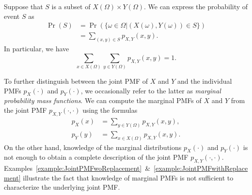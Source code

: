 Suppose that $S$ is a subset of $X(\Omega) \times Y(\Omega)$.
We can express the probability of event $S$ as
\begin{equation*}
\begin{split}
\Pr (S) &= \Pr (\{ \omega \in \Omega | (X(\omega), Y(\omega)) \in S \}) \\
&= \sum_{(x,y) \in S} p_{X,Y} (x, y) .
\end{split}
\end{equation*}
In particular, we have
\begin{equation*}
\sum_{x \in X(\Omega)} \sum_{y \in Y(\Omega)} p_{X,Y} (x, y) = 1.
\end{equation*}

To further distinguish between the joint PMF of $X$ and $Y$ and the individual PMFs $p_X (\cdot)$ and $p_Y (\cdot)$, we occasionally refer to the latter as \emph{marginal probability mass functions}.  
We can compute the marginal PMFs of $X$ and $Y$ from the joint PMF $p_{X,Y}(\cdot,\cdot)$ using the formulas
\begin{align*}
p_X (x) &= \sum_{y \in Y(\Omega)} p_{X,Y} (x,y), \\
p_Y (y) &= \sum_{x \in X(\Omega)} p_{X,Y} (x,y).
\end{align*}
On the other hand, knowledge of the marginal distributions $p_X (\cdot)$ and $p_Y (\cdot)$ is not enough to obtain a complete description of the joint PMF $p_{X,Y} (\cdot,\cdot)$.
Examples~\ref{example:JointPMFwoReplacement}~\&~\ref{example:JointPMFwithReplacement} illustrate the fact that knowledge of marginal PMFs is not sufficient to characterize the underlying joint PMF.


